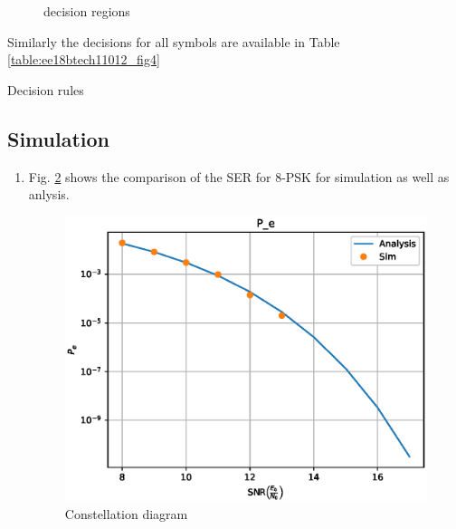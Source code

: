 \begin{enumerate}[label=\thesubsection.\arabic*.,ref=\thesubsection.\theenumi]
\begin{figure}[!ht]
                \resizebox{\columnwidth}{!}{}

\caption{decision regions}
\label{fig:ee18btech11012_fig2}
	
\end{figure}

%
%
%	
Similarly the decisions for all symbols 
are available in Table \ref{table:ee18btech11012_fig4}
%
\begin{table}[!ht]
                \resizebox{\columnwidth}{!}{}
\caption{Decision rules}
\label{table:ee18btech11012_fig4}
\end{table}
\end{enumerate}

\subsection{Simulation}
\begin{enumerate}[label=\thesubsection.\arabic*.,ref=\thesubsection.\theenumi]


\item Fig. \ref{fig:ee18btech11012_ser} shows the comparison of the SER for 8-PSK for simulation as well as anlysis.

\begin{figure}[!ht]
\includegraphics[width=\columnwidth]{./figs/8psk/ee18btech11012.eps}
\caption{Constellation diagram}
\label{fig:ee18btech11012_ser}
\end{figure}

\end{enumerate}
